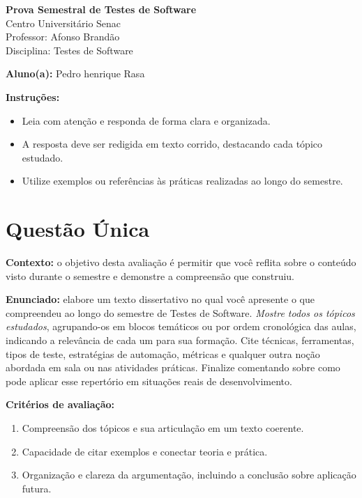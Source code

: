 \documentclass[12pt]{article}
\begin{document}
\begin{center}
  {\Large \textbf{Prova Semestral de Testes de Software}}\\
  Centro Universitário Senac\\
  Professor: Afonso Brandão\\
  Disciplina: Testes de Software
\end{center}

\vspace{0.4cm}

\begin{center}
  \textbf{Aluno(a):} Pedro henrique Rasa
\end{center}

\vspace{0.5cm}

\begin{center}
  \textbf{Instruções:}
\end{center}
\begin{itemize}[leftmargin=*]
  \item Leia com atenção e responda de forma clara e organizada.
  \item A resposta deve ser redigida em texto corrido, destacando cada tópico estudado.
  \item Utilize exemplos ou referências às práticas realizadas ao longo do semestre.
\end{itemize}

\section*{Questão Única}
\textbf{Contexto:} o objetivo desta avaliação é permitir que você reflita sobre o conteúdo visto durante o semestre e demonstre a compreensão que construiu.

\textbf{Enunciado:} elabore um texto dissertativo no qual você apresente o que compreendeu ao longo do semestre de Testes de Software. \textit{Mostre todos os tópicos estudados}, agrupando-os em blocos temáticos ou por ordem cronológica das aulas, indicando a relevância de cada um para sua formação. Cite técnicas, ferramentas, tipos de teste, estratégias de automação, métricas e qualquer outra noção abordada em sala ou nas atividades práticas. Finalize comentando sobre como pode aplicar esse repertório em situações reais de desenvolvimento.

\textbf{Critérios de avaliação:}
\begin{enumerate}[label=\arabic*.]
  \item Compreensão dos tópicos e sua articulação em um texto coerente.
  \item Capacidade de citar exemplos e conectar teoria e prática.
  \item Organização e clareza da argumentação, incluindo a conclusão sobre aplicação futura.
\end{enumerate}
\end{document}

